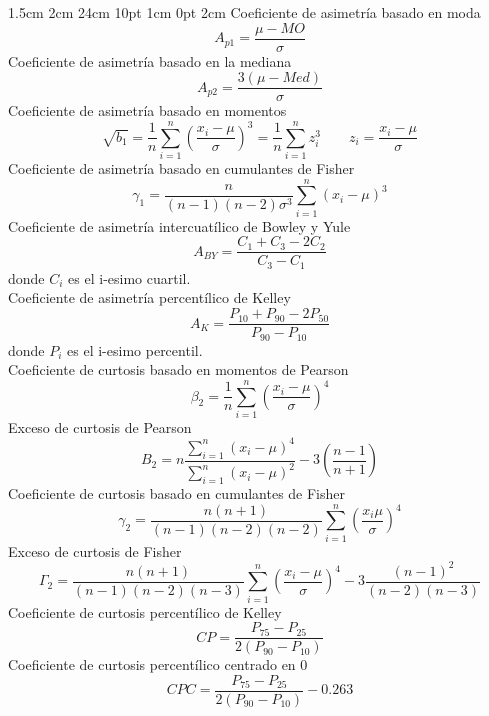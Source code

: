 \documentclass[12pt,letterpaper]{report}
\begin{document}
\setmargins{2.5cm}      
{1.5cm}                     
{2cm}  
{24cm}                    
{10pt}                          
{1cm}                          
{0pt}                             
{2cm}
Coeficiente de asimetría basado en moda
\begin{equation*}
    A_{p1}= \frac{\mu - MO}{\sigma}
\end{equation*}
Coeficiente de asimetría basado en la mediana
\begin{equation*}
    A_{p2}= \frac{3\left(\mu - Med\right)}{\sigma}
\end{equation*}
Coeficiente de asimetría basado en momentos
\begin{equation*}
    \sqrt{b_1} = \frac{1}{n}\sum_{i=1}^n \left(\frac{x_i-\mu}{\sigma}\right)^3= \frac{1}{n}\sum_{i=1}^n z_i^3 \qquad z_i = \frac{x_i-\mu}{\sigma}
\end{equation*}
Coeficiente de asimetría basado en cumulantes de Fisher
\begin{equation*}
    \gamma_1 = \frac{n}{(n-1)(n-2)\sigma^3} \sum_{i=1}^n (x_i-\mu)^3
\end{equation*}
Coeficiente de asimetría intercuatílico de Bowley y Yule
\begin{equation*}
A_{BY}= \frac{C_1+C_3-2C_2}{C_3-C_1}
\end{equation*}
donde $C_i$ es el i-esimo cuartil.\\
Coeficiente de asimetría percentílico de Kelley
\begin{equation*}
    A_K=\frac{P_{10}+P_{90}-2P_{50}}{P_{90}-P_{10}}
\end{equation*}
donde $P_i$ es el i-esimo percentil.\\
Coeficiente de curtosis basado en momentos de Pearson
\begin{equation*}
    \beta_2 = \frac{1}{n} \sum_{i=1}^n \left(\frac{x_i-\mu}{\sigma}\right)^4
\end{equation*}
Exceso de curtosis de Pearson
\begin{equation*}
    B_2 =n \frac{\sum\limits_{i=1}^n (x_i-\mu)^4}{\sum\limits_{i=1}^n(x_i-\mu)^2} - 3 \left(\frac{n-1}{n+1}\right)
\end{equation*}
Coeficiente de curtosis basado en cumulantes de Fisher
\begin{equation*}
     \gamma_2 = \frac{n(n+1)}{(n-1)(n-2)(n-2)}\sum_{i=1}^n \left(\frac{x_i\mu}{\sigma}\right)^4
\end{equation*}
Exceso de curtosis de Fisher
\begin{equation*}
    \Gamma_2=\frac{n(n+1)}{(n-1)(n-2)(n-3)} \sum_{i=1}^n \left(\frac{x_i-\mu}{\sigma}\right)^4 - 3\frac{(n-1)^2}{(n-2)(n-3)}
\end{equation*}
Coeficiente de curtosis percentílico de Kelley
\begin{equation*}
    CP= \frac{P_{75}-P_{25}}{2(P_{90}-P_{10})}
\end{equation*}
Coeficiente de curtosis percentílico centrado en 0
\begin{equation*}
    CPC= \frac{P_{75}-P_{25}}{2(P_{90}-P_{10})} - 0.263
\end{equation*}
\end{document}
